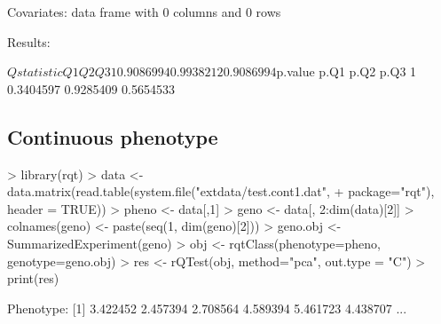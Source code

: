 \documentclass{article}
\begin{document}
\begin{Schunk}
\begin{Soutput}
Covariates:
data frame with 0 columns and 0 rows


Results:

$Qstatistic
         Q1        Q2        Q3
1 0.9086994 0.9938212 0.9086994

$p.value
       p.Q1      p.Q2      p.Q3
1 0.3404597 0.9285409 0.5654533
\end{Soutput}
\end{Schunk}

\subsection{Continuous phenotype}

\begin{Schunk}
\begin{Sinput}
> library(rqt)
> data <- data.matrix(read.table(system.file("extdata/test.cont1.dat",
+                                            package="rqt"), header = TRUE))
> pheno <- data[,1]
> geno <- data[, 2:dim(data)[2]]
> colnames(geno) <- paste(seq(1, dim(geno)[2]))
> geno.obj <- SummarizedExperiment(geno)
> obj <- rqtClass(phenotype=pheno, genotype=geno.obj)
> res <- rQTest(obj, method="pca", out.type = "C")
> print(res)
\end{Sinput}
\begin{Soutput}
Phenotype:
[1] 3.422452 2.457394 2.708564 4.589394 5.461723 4.438707
...


\end{Soutput}
\end{Schunk}
\end{document}
